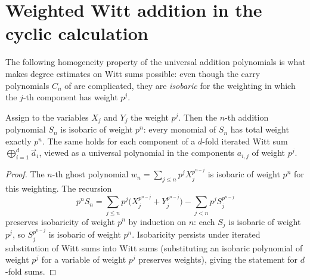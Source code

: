

\section{Weighted Witt addition in the cyclic calculation}

The following homogeneity property of the universal addition polynomials is what
makes degree estimates on Witt sums possible: even though the carry polynomials $C_n$
of  are complicated, they are \emph{isobaric} for the
weighting in which the $j$-th component has weight $p^j$.

\begin{lemma}\label{lemma:witt_addition_isobaric}
Assign to the variables $X_j$ and $Y_j$ the weight $p^j$. Then the $n$-th addition
polynomial $S_n$ is isobaric of weight $p^n$: every monomial of $S_n$ has total weight
exactly $p^n$. The same holds for each component of a $d$-fold iterated Witt sum
$\bigoplus_{i=1}^{d} \vec a_i$, viewed as a universal polynomial in the components
$a_{i,j}$ of weight $p^j$.
\end{lemma}

\begin{proof}
The $n$-th ghost polynomial $w_n = \sum_{j \le n} p^j X_j^{p^{n-j}}$ is isobaric of
weight $p^n$ for this weighting. The recursion
\[
p^n S_n = \sum_{j \le n} p^j \bigl(X_j^{p^{n-j}} + Y_j^{p^{n-j}}\bigr)
- \sum_{j < n} p^j S_j^{p^{n-j}}
\]
preserves isobaricity of weight $p^n$ by induction on $n$: each $S_j$ is isobaric of
weight $p^j$, so $S_j^{p^{n-j}}$ is isobaric of weight $p^n$. Isobaricity persists
under iterated substitution of Witt sums into Witt sums (substituting an isobaric
polynomial of weight $p^j$ for a variable of weight $p^j$ preserves weights), giving
the statement for $d$-fold sums.
\end{proof}
